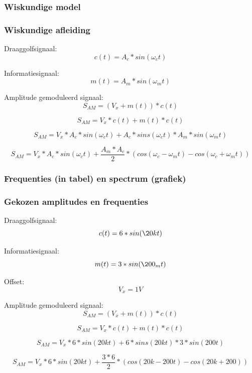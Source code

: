 \documentclass[11pt,a4paper]{article}
\begin{document}
			\subsubsection{Wiskundige model}
			\subsubsection{Wiskundige afleiding}
Draaggolfsignaal: \[c(t) = A_c*sin(\omega_ct)\]	

Informatiesignaal: \[m(t) = A_m*sin(\omega_mt)\]
	
Amplitude gemoduleerd signaal: \[ S_{AM} = (V_x + m(t)) * c(t) \]

\[S_{AM} = V_x * c(t) + m(t) * c(t) \]

\[S_{AM} = V_x * A_c*sin(\omega_ct) + A_c*sins(\omega_ct) * A_m*sin(\omega_mt) \]

\[S_{AM} = V_x * A_c*sin(\omega_ct) + \frac{A_m * A_c}{2} * (cos(\omega_c - \omega_mt) - cos(\omega_c + \omega_mt)) \]

			\subsubsection{Frequenties (in tabel) en spectrum (grafiek)}
			\subsubsection{Gekozen amplitudes en frequenties}
Draaggolfsignaal: \[c(t) = 6*sin(\20kt)\]

Informatiesignaal: \[m(t) = 3*sin(\200_mt)\]

Offset: \[V_x = 1V \]

Amplitude gemoduleerd signaal: \[ S_{AM} = (V_x + m(t)) * c(t) \]

\[S_{AM} = V_x * c(t) + m(t) * c(t) \]

\[S_{AM} = V_x * 6*sin(20kt) + 6*sins(20kt) * 3*sin(200t) \]

\[S_{AM} = V_x * 6*sin(20kt) + \frac{3 * 6}{2} * (cos(20k - 200t) - cos(20k + 200)) \]
\end{document}
